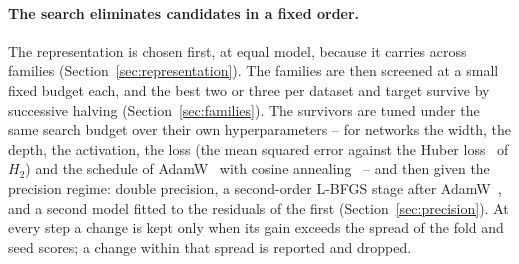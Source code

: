 \paragraph{The search eliminates candidates in a fixed order.}
The representation is chosen first, at equal model, because it carries across families (Section~\ref{sec:representation}). The families are then screened at a small fixed budget each, and the best two or three per dataset and target survive by successive halving (Section~\ref{sec:families}). The survivors are tuned under the same search budget over their own hyperparameters -- for networks the width, the depth, the activation, the loss (the mean squared error against the Huber loss~\citep{Huber1964} of $H_2$) and the schedule of AdamW~\citep{Loshchilov2017_AdamW} with cosine annealing~\citep{TODO_SGDR} -- and then given the precision regime: double precision, a second-order L-BFGS stage after AdamW~\citep{Michaud2023_PrecisionML}, and a second model fitted to the residuals of the first (Section~\ref{sec:precision}). At every step a change is kept only when its gain exceeds the spread of the fold and seed scores; a change within that spread is reported and dropped.
